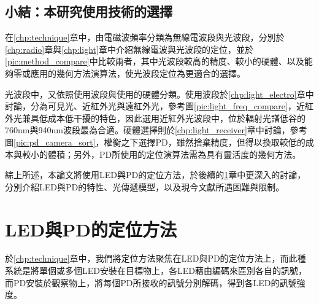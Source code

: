                 


        
                

        \subsection{小結：本研究使用技術的選擇}
        

        在\ref{chp:technique}章中，由電磁波頻率分類為無線電波段與光波段，分別於\ref{chp:radio}章與\ref{chp:light}章中介紹無線電波與光波段的定位，並於\ref{pic:method_compare}中比較兩者，其中光波段較高的精度、較小的硬體、以及能夠零或應用的幾何方法演算法，使光波段定位為更適合的選擇。

        光波段中，又依照使用波段與使用的硬體分類。使用波段於\ref{chp:light_electro}章中討論，分為可見光、近紅外光與遠紅外光，參考圖\ref{pic:light_freq_compare}，近紅外光兼具低成本低干擾的特色，因此選用近紅外光波段中，位於輻射光譜低谷的760nm與940nm波段最為合適。硬體選擇則於\ref{chp:light_receiver}章中討論，參考圖\ref{pic:pd_camera_sort}，權衡之下選擇PD，雖然捨棄精度，但得以換取較低的成本與較小的體積；另外，PD所使用的定位演算法需為具有靈活度的幾何方法。
    
        
        綜上所述，本論文將使用LED與PD的定位方法，於後續的\ref{chp:LEDandPD}章中更深入的討論，分別介紹LED與PD的特性、光傳遞模型，以及現今文獻所遇困難與限制。


        

    

        

        

        

        


        

        

            

          

        


\section{LED與PD的定位方法}
\label{chp:LEDandPD}
    


    
    於\ref{chp:technique}章中，我們將定位方法聚焦在LED與PD的定位方法上，而此種系統是將單個或多個LED安裝在目標物上，各LED藉由編碼來區別各自的訊號，而PD安裝於觀察物上，將每個PD所接收的訊號分別解碼，得到各LED的訊號強度。

